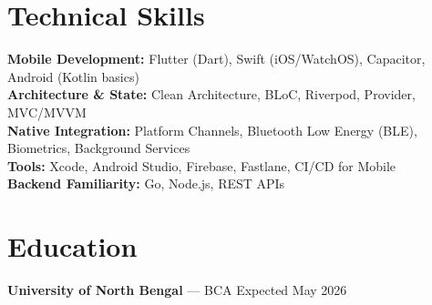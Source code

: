 \documentclass[10pt, letterpaper]{article}
\begin{document}
\section{Technical Skills}

\textbf{Mobile Development:} Flutter (Dart), Swift (iOS/WatchOS), Capacitor, Android (Kotlin basics) \\
\textbf{Architecture \& State:} Clean Architecture, BLoC, Riverpod, Provider, MVC/MVVM \\
\textbf{Native Integration:} Platform Channels, Bluetooth Low Energy (BLE), Biometrics, Background Services \\
\textbf{Tools:} Xcode, Android Studio, Firebase, Fastlane, CI/CD for Mobile \\
\textbf{Backend Familiarity:} Go, Node.js, REST APIs

\section{Education}

\textbf{University of North Bengal} — BCA \hfill Expected May 2026
\end{document}
